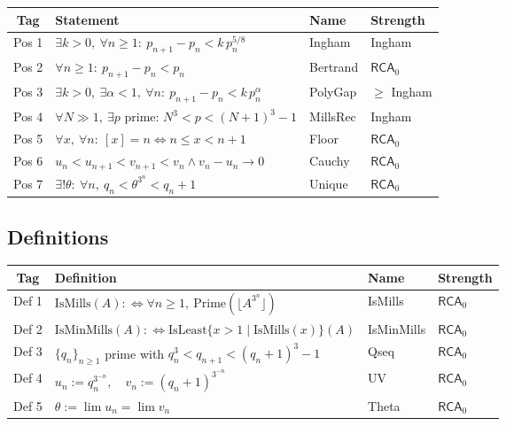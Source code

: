 \documentclass[11pt,reqno]{amsart}
\theoremstyle{redplain}
\numberwithin{equation}{section}
\begin{document}
\begin{center}
{\small
\begin{tabular}{|c|m{5.0cm}|m{2.0cm}|m{1.8cm}|}
\hline
\textbf{Tag} & \textbf{Statement} & \textbf{Name} & \textbf{Strength}\\
\hline
Pos 1 & $\exists k>0,\ \forall n\ge1:\ p_{n+1}-p_n<k\,p_n^{5/8}$ & Ingham & Ingham \\
\hline
Pos 2 & $\forall n\ge1:\ p_{n+1}-p_n<p_n$ & Bertrand & $\mathsf{RCA}_0$ \\
\hline
Pos 3 & $\exists k>0,\ \exists\alpha<1,\ \forall n:\ p_{n+1}-p_n<k\,p_n^{\alpha}$ & PolyGap & $\ge$ Ingham \\
\hline
Pos 4 & $\forall N\gg1,\ \exists p$ prime: $N^3<p<(N+1)^3-1$ & MillsRec & Ingham \\
\hline
Pos 5 & $\forall x,\ \forall n:\ [x]=n\iff n\le x<n+1$ & Floor & $\mathsf{RCA}_0$ \\
\hline
Pos 6 & $u_n<u_{n+1}<v_{n+1}<v_n\wedge v_n-u_n\to0$ & Cauchy & $\mathsf{RCA}_0$ \\
\hline
Pos 7 & $\exists!\theta:\ \forall n,\ q_n<\theta^{3^n}<q_n+1$ & Unique & $\mathsf{RCA}_0$ \\
\hline
\end{tabular}
}
\end{center}

\subsection{Definitions}
\label{sec:definitions-tab}

\begin{center}
{\small
\begin{tabular}{|c|m{6.0cm}|m{2.2cm}|m{1.8cm}|}
\hline
\textbf{Tag} & \textbf{Definition} & \textbf{Name} & \textbf{Strength}\\
\hline
Def 1 & $\mathrm{IsMills}(A):\iff\forall n\ge1,\ \mathrm{Prime}(\lfloor A^{3^n}\rfloor)$ & IsMills & $\mathsf{RCA}_0$ \\
\hline
Def 2 & $\mathrm{IsMinMills}(A):\iff\mathrm{IsLeast}\{x>1\mid\mathrm{IsMills}(x)\}(A)$ & IsMinMills & $\mathsf{RCA}_0$ \\
\hline
Def 3 & $\{q_n\}_{n\ge1}$ prime with $q_n^3<q_{n+1}<(q_n+1)^3-1$ & Qseq & $\mathsf{RCA}_0$ \\
\hline
Def 4 & $u_n:=q_n^{3^{-n}},\quad v_n:=(q_n+1)^{3^{-n}}$ & UV & $\mathsf{RCA}_0$ \\
\hline
Def 5 & $\theta:=\lim u_n=\lim v_n$ & Theta & $\mathsf{RCA}_0$ \\
\hline
\end{tabular}
}
\end{center}
\end{document}
